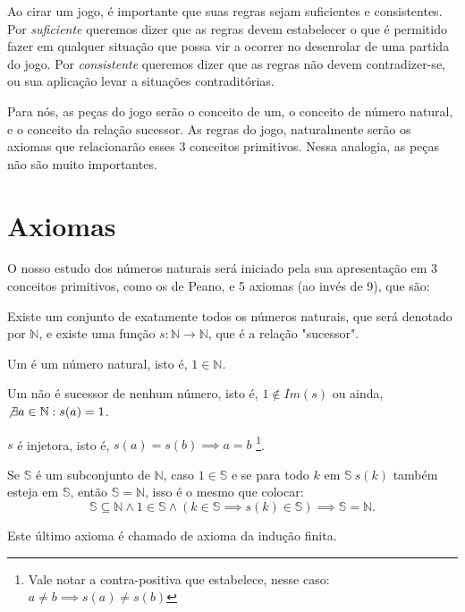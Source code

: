 \documentclass[../main.tex]{subfiles}
\begin{document}
\begin{displayquote} Ao cirar um jogo, é importante que suas regras sejam suficientes e consistentes. Por \emph{suficiente} queremos dizer que as regras devem estabelecer o que é permitido fazer em qualquer situação que possa vir a ocorrer no desenrolar de uma partida do jogo. Por \emph{consistente} queremos dizer que as regras não devem contradizer-se, ou sua aplicação levar a situações contraditórias. \Parencite[p. 13-14]{barbosa}
\end{displayquote}

Para nós, as peças do jogo serão o conceito de um, o conceito de número natural, e o conceito da relação sucessor. As regras do jogo, naturalmente serão os axiomas que relacionarão esses 3 conceitos primitivos. Nessa analogia, as peças não são muito importantes.

\section{Axiomas}
O nosso estudo dos números naturais será iniciado pela sua apresentação em 3 conceitos primitivos, como os de Peano, e 5 axiomas (ao invés de 9), que são:

\begin{axi}\label{axi-existe-n-s}
    Existe um conjunto de exatamente todos os números naturais, que será denotado por $\mathbb{N}$, e existe uma função $s: \mathbb{N} \rightarrow \mathbb{N}$, que é a relação "sucessor". 
\end{axi}
\begin{axi}\label{axi-um-natural}
    Um é um número natural, isto é, $1 \in \mathbb{N}$.
\end{axi}
\begin{axi}\label{axi-um-nao-sucessor}
    Um não é sucessor de nenhum número, isto é, $1 \not \in Im(s)$ ou ainda, $\not \exists a \in \mathbb{N} : s(a) = 1$.
\end{axi}
\begin{axi}\label{axi-s-injetora}
    $s$ é injetora, isto é, $s(a) = s(b) \implies a = b$ \footnote{Vale notar a contra-positiva que estabelece, nesse caso: $a \neq b \implies s(a) \neq s(b)$}.
\end{axi}
\begin{axi}\label{axi-ind-finita}
    Se $\mathbb{S}$ é um subconjunto de $\mathbb{N}$, caso $1 \in \mathbb{S}$ e se para todo $k$ em $\mathbb{S}\ s(k)$ também esteja em $\mathbb{S}$, então $\mathbb{S} = \mathbb{N}$, isso é o mesmo que colocar: \\
     \[ \mathbb{S} \subseteq \mathbb{N} \land 1 \in \mathbb{S} \land ( k \in \mathbb{S} \implies s(k) \in \mathbb{S}) \implies \mathbb{S} = \mathbb{N} .\]
\end{axi}
Este último axioma é chamado de axioma da indução finita.
\end{document}

